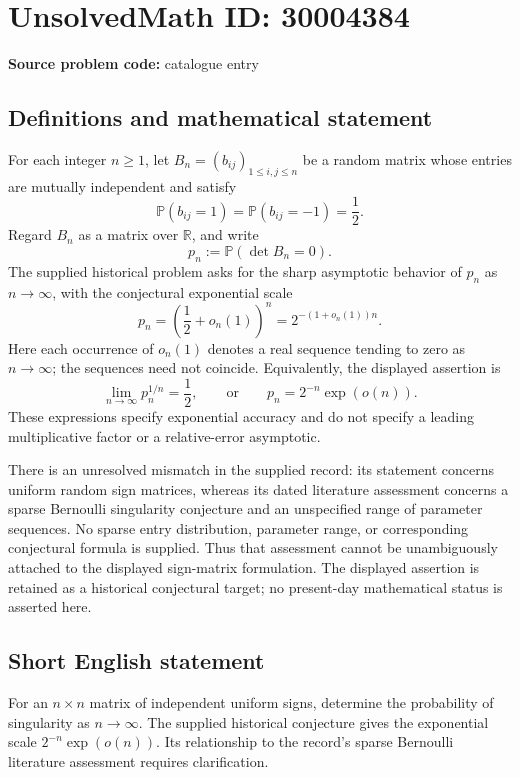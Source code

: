 \documentclass[11pt]{article}
\newcommand{\R}{\mathbb{R}}
\begin{document}
\section*{UnsolvedMath ID: 30004384}
\textbf{Source problem code:} catalogue entry
\subsection{Definitions and mathematical statement}
For each integer \(n\geq 1\), let \(B_n=(b_{ij})_{1\leq i,j\leq n}\) be a random matrix whose entries are mutually independent and satisfy
\[
\mathbb P(b_{ij}=1)=\mathbb P(b_{ij}=-1)=\frac12.
\]
Regard \(B_n\) as a matrix over \(\R\), and write
\[
p_n:=\mathbb P(\det B_n=0).
\]
The supplied historical problem asks for the sharp asymptotic behavior of \(p_n\) as \(n\to\infty\), with the conjectural exponential scale
\[
p_n=\left(\frac12+o_n(1)\right)^n
=2^{-(1+o_n(1))n}.
\]
Here each occurrence of \(o_n(1)\) denotes a real sequence tending to zero as \(n\to\infty\); the sequences need not coincide. Equivalently, the displayed assertion is
\[
\lim_{n\to\infty}p_n^{1/n}=\frac12,
\qquad\text{or}\qquad
p_n=2^{-n}\exp(o(n)).
\]
These expressions specify exponential accuracy and do not specify a leading multiplicative factor or a relative-error asymptotic.

There is an unresolved mismatch in the supplied record: its statement concerns uniform random sign matrices, whereas its dated literature assessment concerns a sparse Bernoulli singularity conjecture and an unspecified range of parameter sequences. No sparse entry distribution, parameter range, or corresponding conjectural formula is supplied. Thus that assessment cannot be unambiguously attached to the displayed sign-matrix formulation. The displayed assertion is retained as a historical conjectural target; no present-day mathematical status is asserted here.
\subsection{Short English statement}
For an \(n\times n\) matrix of independent uniform signs, determine the probability of singularity as \(n\to\infty\). The supplied historical conjecture gives the exponential scale \(2^{-n}\exp(o(n))\). Its relationship to the record's sparse Bernoulli literature assessment requires clarification.
\end{document}
